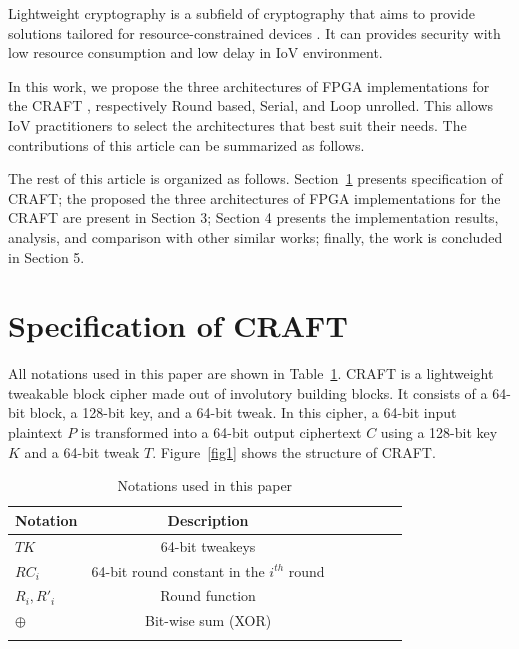 \documentclass[sn-basic]{sn-jnl}%
\begin{document}
Lightweight cryptography is a subfield of cryptography that aims to provide solutions tailored for resource-constrained devices \cite{mckay2016report}.
It can provides security with low resource consumption and low delay in IoV environment.

In this work, we propose the three architectures of FPGA implementations for the CRAFT \cite{beierle2019craft}, respectively Round based, Serial, and Loop unrolled.
This allows IoV practitioners to select the architectures that best suit their needs.
The contributions of this article can be summarized as follows.

The rest of this article is organized as follows.
Section~\ref{sec2} presents specification of CRAFT; the proposed the three architectures of FPGA implementations for the CRAFT are present in Section 3; Section 4 presents the implementation results, analysis, and comparison with other similar works; finally, the work is concluded in Section 5.


\section{Specification of CRAFT}\label{sec2}

All notations used in this paper are shown in Table~\ref{tab1}.
CRAFT is a lightweight tweakable block cipher made out of involutory building blocks.
It consists of a 64-bit block, a 128-bit key, and a 64-bit tweak. In this cipher, a 64-bit input plaintext $P$ is transformed into a 64-bit output ciphertext $C$ using a 128-bit key $K$ and a 64-bit tweak $T$. Figure~\ref{fig1} shows the structure of CRAFT.

\begin{table}[h]
    \caption{Notations used in this paper}\label{tab1}%
    \begin{tabular*}{\textwidth}{@{\extracolsep\fill}lcccccc}
        \toprule
        Notation   & Description                                 \\
        \midrule
        $TK$       & 64-bit tweakeys                             \\
        $RC_i$     & 64-bit round constant in the $i^{th}$ round \\
        $R_i,R'_i$ & Round function                              \\
        $\oplus$   & Bit-wise sum (XOR)                          \\
        \botrule
    \end{tabular*}
\end{table}
\end{document}
